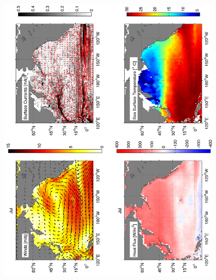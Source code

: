 \begin{figure}[hbt]
  \begin{center}
  \includegraphics[angle=270]{figs/WindOverview/SurfaceCurrents07}
    \caption{}
    \label{fig:}  
  \end{center}
\end{figure}

